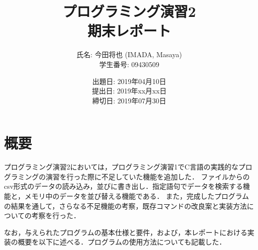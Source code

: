 \documentclass[a4j,11pt]{jarticle}
\title{プログラミング演習2 \\
       期末レポート}
\author{氏名: 今田将也 (IMADA, Masaya) \\
        学生番号: 09430509}
\date{出題日: 2019年04月10日 \\
      提出日: 2019年xx月xx日 \\
      締切日: 2019年07月30日 \\}  %
\begin{document}
\maketitle



\section{概要}\label{sec:gaiyou}

プログラミング演習2においては，プログラミング演習1でC言語の実践的なプログラミングの演習を行った際に不足していた機能を追加した．
ファイルからのcsv形式のデータの読み込み，並びに書き出し．指定語句でデータを検索する機能と，メモリ中のデータを並び替える機能である．
また，完成したプログラムの結果を通して，さらなる不足機能の考察，既存コマンドの改良案と実装方法についての考察を行った．


なお，与えられたプログラムの基本仕様と要件，および，本レポートにおける実装の概要を以下に述べる．プログラムの使用方法についても記載した．
\end{document}
